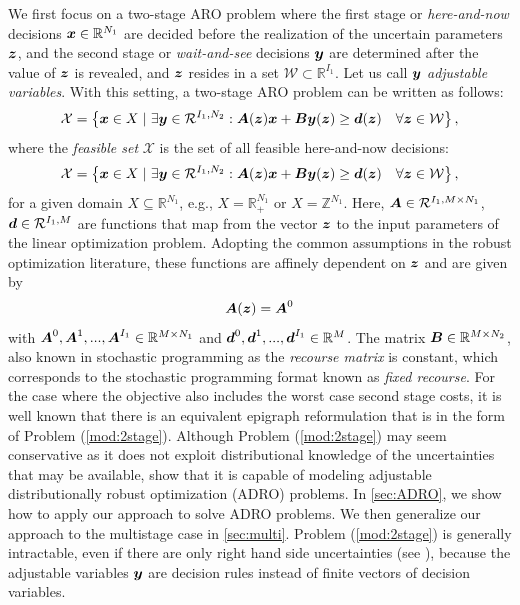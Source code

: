 \documentclass[fleqn,mnsc,blindrev]{informs4}
\newcommand{\mb}[1]{\mbox{\boldmath \ensuremath{#1}}}
\renewcommand{\Re}{\mathbb{R}}
\begin{document}
We first focus on a two-stage ARO problem where the first stage or {\em here-and-now} decisions  $\mb{x} \in \Re^{N_1}$ are decided before the realization of the uncertain parameters $\mb{z}$,  {and} the second stage or {\em wait-and-see} decisions $\mb{y}$ are determined after the value of $\mb{z}$ is revealed, and $\mb{z}$ resides in a set $\mathcal{W} \subset \mathbb{R}^{I_1}$. Let us call $\mb{y}$ {\em adjustable variables}. With this setting, a two-stage ARO problem can be written as follows:
\begin{equation}
\label{mod:2stage}
\mathcal{X} = \left\{ \mb{x} \in X \hspace{3pt} | \hspace{3pt}  \exists \mb{y} \in \mathcal{R}^{I_1,N_2}: \mb{A}(\mb{z})\mb{x}+\mb{B}\mb{y}(\mb{z}) \geq\mb{d}(\mb{z})  \quad  \forall \mb{z} \in \mathcal{W} \right\},
\end{equation}
where the {\em feasible set} $\mathcal{X}$ is the set of all feasible here-and-now decisions:
\begin{equation}\label{set:X}
\mathcal{X} = \left\{ \mb{x} \in X \hspace{3pt} | \hspace{3pt}  \exists \mb{y} \in \mathcal{R}^{I_1,N_2}: \mb{A}(\mb{z})\mb{x}+\mb{B}\mb{y}(\mb{z}) \geq\mb{d}(\mb{z})  \quad  \forall \mb{z} \in \mathcal{W} \right\},
\end{equation}
for a given domain $X\subseteq \mathbb{R}^{N_1}$, e.g., $X= \mathbb{R}^{N_1}_+$  {or $X= \mathbb{Z}^{N_1}$}. Here,  $\mb{A} \in \mathcal{R}^{I_1,M \times N_1}$,  $\mb{d} \in \mathcal{R}^{I_1,M}$ are functions that map from the vector $\mb{z}$ to the input parameters of the linear optimization problem. Adopting the common assumptions in the robust optimization literature, these functions are affinely dependent on $\mb{z}$ and are given by
\begin{equation*}
\mb{A}(\mb{z}) = \mb{A}^0%
\end{equation*}
	with $\mb{A}^0, \mb{A}^1,..., \mb{A}^{I_1} \in \Re^{M \times N_1}$ and $\mb{d}^0, \mb{d}^1,..., \mb{d}^{I_1} \in \Re^{M}$. The matrix $\mb{B} \in \Re^{M \times N_2}$, also known in stochastic programming as the {\em recourse matrix} is constant, which corresponds to the stochastic programming format known as {\em fixed recourse}. For the case where the objective also includes the worst case second stage costs, it is well known that there is an equivalent epigraph reformulation that is in the form of Problem (\ref{mod:2stage}). Although Problem (\ref{mod:2stage}) may seem conservative as it does not exploit distributional knowledge of the uncertainties that may be available, \cite{bsz17} show that it is capable of modeling adjustable distributionally robust optimization (ADRO) problems. In \textsection \ref{sec:ADRO}, we show how to apply our approach to solve ADRO problems.  {We then generalize our approach to the multistage case in \textsection \ref{sec:multi}.} Problem (\ref{mod:2stage}) is generally intractable, even if there are only right hand side uncertainties (see \cite{m11}), because the adjustable variables $\mb{y}$ are decision rules instead of finite vectors of decision variables.
	
\end{document}
